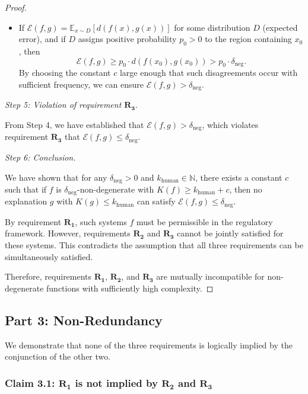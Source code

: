 \documentclass[11pt,letter,leqno]{article}
\begin{document}
\begin{proof}
\begin{itemize}
\item If $\mathcal{E}(f,g) = \mathbb{E}_{x \sim D}[d(f(x), g(x))]$ for some 
distribution $D$ (expected error), and if $D$ assigns positive probability 
$p_0 > 0$ to the region containing $x_0$, then
\[
\mathcal{E}(f,g) \geq p_0 \cdot d(f(x_0), g(x_0)) > p_0 \cdot \delta_{\text{neg}}.
\]
By choosing the constant $c$ large enough that such disagreements occur with 
sufficient frequency, we can ensure $\mathcal{E}(f,g) > \delta_{\text{neg}}$.
\end{itemize}

\textit{Step 5: Violation of requirement $\mathbf{R_3}$.}

From Step 4, we have established that $\mathcal{E}(f,g) > \delta_{\text{neg}}$, 
which violates requirement $\mathbf{R_3}$ that $\mathcal{E}(f,g) \leq 
\delta_{\text{neg}}$.

\textit{Step 6: Conclusion.}

We have shown that for any $\delta_{\text{neg}} > 0$ and $k_{\text{human}} 
\in \mathbb{N}$, there exists a constant $c$ such that if $f$ is 
$\delta_{\text{neg}}$-non-degenerate with $K(f) \geq k_{\text{human}} + c$, then 
no explanation $g$ with $K(g) \leq k_{\text{human}}$ can satisfy 
$\mathcal{E}(f,g) \leq \delta_{\text{neg}}$.

By requirement $\mathbf{R_1}$, such systems $f$ must be permissible in the regulatory 
framework. However, requirements $\mathbf{R_2}$ and $\mathbf{R_3}$ cannot be jointly 
satisfied for these systems. This contradicts the assumption that all three 
requirements can be simultaneously satisfied.

Therefore, requirements $\mathbf{R_1}$, $\mathbf{R_2}$, and $\mathbf{R_3}$ are mutually 
incompatible for non-degenerate functions with sufficiently high complexity.
\end{proof}

\subsection*{Part 3: Non-Redundancy}

We demonstrate that none of the three requirements is logically implied by the 
conjunction of the other two.

\subsubsection*{Claim 3.1: $\mathbf{R_1}$ is not implied by $\mathbf{R_2}$ and $\mathbf{R_3}$}
\end{document}
